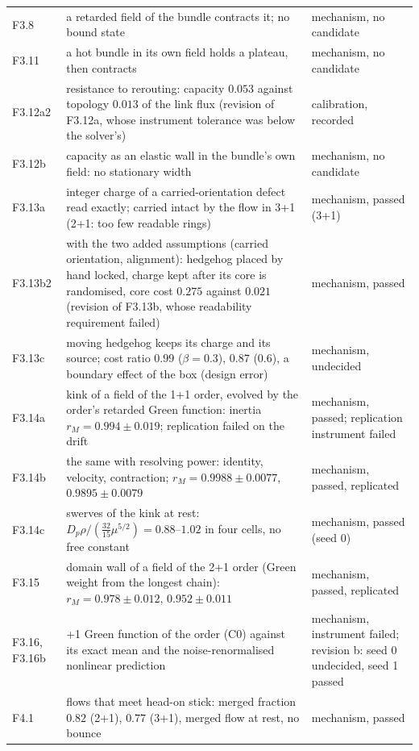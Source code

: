 {\begin{xltabular}{\linewidth}{>{\raggedright\arraybackslash}p{1.9cm}>{\raggedright\arraybackslash}X>{\raggedright\arraybackslash}p{3.0cm}}
F3.8 & a retarded field of the bundle contracts it; no bound state & mechanism, no candidate\\
F3.11 & a hot bundle in its own field holds a plateau, then contracts & mechanism, no candidate\\
F3.12a2 & resistance to rerouting: capacity $0.053$ against topology $0.013$ of the link flux (revision of F3.12a, whose instrument tolerance was below the solver's) & calibration, recorded\\
F3.12b & capacity as an elastic wall in the bundle's own field: no stationary width & mechanism, no candidate\\
F3.13a & integer charge of a carried-orientation defect read exactly; carried intact by the flow in 3+1 (2+1: too few readable rings) & mechanism, passed (3+1)\\
F3.13b2 & with the two added assumptions (carried orientation, alignment): hedgehog placed by hand locked, charge kept after its core is randomised, core cost $0.275$ against $0.021$ (revision of F3.13b, whose readability requirement failed) & mechanism, passed\\
F3.13c & moving hedgehog keeps its charge and its source; cost ratio $0.99$ ($\beta=0.3$), $0.87$ ($0.6$), a boundary effect of the box (design error) & mechanism, undecided\\
F3.14a & kink of a field of the 1+1 order, evolved by the order's retarded Green function: inertia $r_M=0.994\pm0.019$; replication failed on the drift & mechanism, passed; replication instrument failed\\
F3.14b & the same with resolving power: identity, velocity, contraction; $r_M=0.9988\pm0.0077$, $0.9895\pm0.0079$ & mechanism, passed, replicated\\
F3.14c & swerves of the kink at rest: $D_p\rho/(\tfrac{32}{15}\mu^{5/2})=0.88$--$1.02$ in four cells, no free constant & mechanism, passed (seed 0)\\
F3.15 & domain wall of a field of the 2+1 order (Green weight from the longest chain): $r_M=0.978\pm0.012$, $0.952\pm0.011$ & mechanism, passed, replicated\\
F3.16, F3.16b & 3+1 Green function of the order (C0) against its exact mean and the noise-renormalised nonlinear prediction & mechanism, instrument failed; revision b: seed 0 undecided, seed 1 passed\\
F4.1 & flows that meet head-on stick: merged fraction $0.82$ (2+1), $0.77$ (3+1), merged flow at rest, no bounce & mechanism, passed\\

\end{xltabular}}
